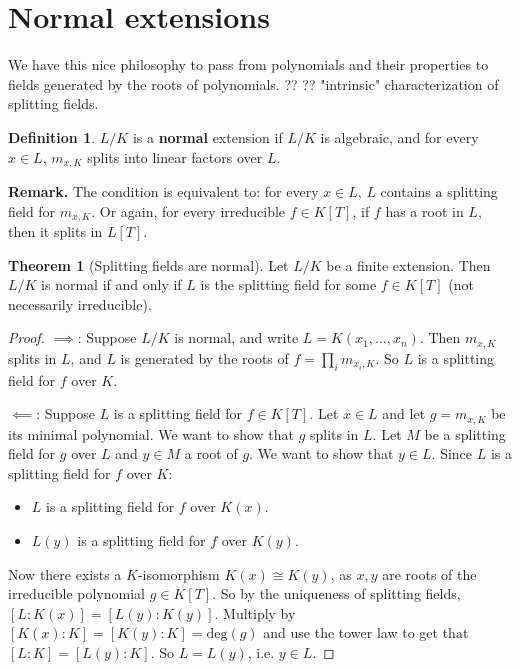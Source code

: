 \documentclass{article}
\theoremstyle{definition}
\newtheorem{theorem}{Theorem}[section]
\newtheorem{defn}{Definition}[section]
\begin{document}
\section{Normal extensions}
    We have this nice philosophy to pass from polynomials and their properties to fields generated by the roots of polynomials. ?? ?? "intrinsic" characterization of splitting fields.
\begin{defn}
    $L/K$ is a \textbf{normal} extension if $L/K$ is algebraic, and for every $x \in L$, $m_{x,K}$ splits into linear factors over $L$.
\end{defn}
\textbf{Remark.} The condition is equivalent to: for every $x \in L$, $L$ contains a splitting field for $m_{x,K}$. Or again, for every irreducible $f \in K[T]$, if $f$ has a root in $L$, then it splits in $L[T]$. 
\begin{theorem}[Splitting fields are normal]
    Let $L/K$ be a finite extension. Then $L/K$ is normal if and only if $L$ is the splitting field for some $f \in K[T]$ (not necessarily irreducible).
\end{theorem}
\begin{proof}
    $\implies $: Suppose $L/K$ is normal, and write $L=K(x_1,\ldots,x_n)$. Then $m_{x,K}$ splits in $L$, and $L$ is generated by the roots of $f = \prod_{i}^{} m_{x_i,K}$. So $L$ is a splitting field for $f$ over $K$.
    \vspace{1mm}
    
    $\impliedby$: Suppose $L$ is a splitting field for $f \in K[T]$. Let $x \in L$ and let $g = m_{x,K}$ be its minimal polynomial. We want to show that $g$ splits in $L$. Let $M$ be a splitting field for $g$ over $L$ and $y \in M$ a root of $g$. We want to show that $y \in L$. Since $L$ is a splitting field for $f$ over $K$:
    \begin{itemize}
        \item $L$ is a splitting field for $f$ over $K(x)$.
        \item $L(y)$ is a splitting field for $f$ over $K(y)$.
    \end{itemize}
    Now there exists a $K$-isomorphism $K(x) \cong K(y)$, as $x,y$ are roots of the irreducible polynomial $g \in K[T]$. So by the uniqueness of splitting fields, $[L : K (x)] = [L(y) : K(y)]$. Multiply by $[K(x) : K] = [K(y) : K] = \text{deg}(g)$ and use the tower law to get that $[L:K] = [L(y) : K]$. So $L=L(y)$, i.e. $y \in L$.
\end{proof}
\end{document}
